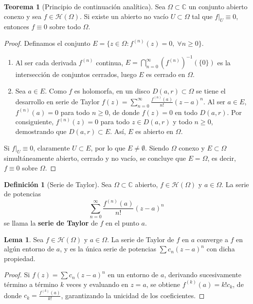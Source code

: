 \documentclass[11pt,a4paper]{article}
\theoremstyle{definition}
\newtheorem{definicion}{Definición}[section]
\newtheorem{teorema}{Teorema}[section]
\newtheorem{lema}{Lema}[section]
\theoremstyle{remark}
\numberwithin{equation}{section}
\begin{document}
\begin{teorema}[Principio de continuación analítica]
Sea $\Omega \subset \mathbb{C}$ un conjunto abierto conexo y sea $f \in \mathcal{H}(\Omega)$. Si existe un abierto no vacío $U \subset \Omega$ tal que $f|_U \equiv 0$, entonces $f \equiv 0$ sobre todo $\Omega$.
\end{teorema}
\begin{proof}
Definamos el conjunto $E = \{z \in \Omega : f^{(n)}(z) = 0, \; \forall n \ge 0\}$.
\begin{enumerate}
\item Al ser cada derivada $f^{(n)}$ continua, $E = \bigcap_{n=0}^\infty (f^{(n)})^{-1}(\{0\})$ es la intersección de conjuntos cerrados, luego $E$ es cerrado en $\Omega$.
\item Sea $a \in E$. Como $f$ es holomorfa, en un disco $D(a,r) \subset \Omega$ se tiene el desarrollo en serie de Taylor $f(z) = \sum_{n=0}^\infty \frac{f^{(n)}(a)}{n!} (z-a)^n$. Al ser $a \in E$, $f^{(n)}(a) = 0$ para todo $n \ge 0$, de donde $f(z) = 0$ en todo $D(a,r)$. Por consiguiente, $f^{(n)}(z) = 0$ para todo $z \in D(a,r)$ y todo $n \ge 0$, demostrando que $D(a,r) \subset E$. Así, $E$ es abierto en $\Omega$.
\end{enumerate}
Si $f|_U \equiv 0$, claramente $U \subset E$, por lo que $E \neq \emptyset$. Siendo $\Omega$ conexo y $E \subset \Omega$ simultáneamente abierto, cerrado y no vacío, se concluye que $E = \Omega$, es decir, $f \equiv 0$ sobre $\Omega$.
\end{proof}

\begin{definicion}[Serie de Taylor]
Sea $\Omega \subset \mathbb{C}$ abierto, $f \in \mathcal{H}(\Omega)$ y $a \in \Omega$. La serie de potencias
\begin{equation}
\sum_{n=0}^\infty \frac{f^{(n)}(a)}{n!} (z-a)^n
\end{equation}
se llama la \textbf{serie de Taylor} de $f$ en el punto $a$.
\end{definicion}

\begin{lema}
Sea $f \in \mathcal{H}(\Omega)$ y $a \in \Omega$. La serie de Taylor de $f$ en $a$ converge a $f$ en algún entorno de $a$, y es la única serie de potencias $\sum c_n (z-a)^n$ con dicha propiedad.
\end{lema}
\begin{proof}
Si $f(z) = \sum c_n (z-a)^n$ en un entorno de $a$, derivando sucesivamente término a término $k$ veces y evaluando en $z = a$, se obtiene $f^{(k)}(a) = k! c_k$, de donde $c_k = \frac{f^{(k)}(a)}{k!}$, garantizando la unicidad de los coeficientes.
\end{proof}
\end{document}

